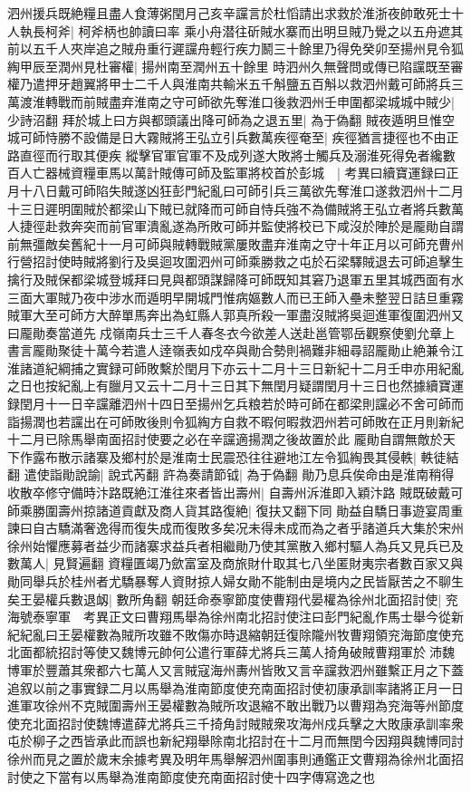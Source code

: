 泗州援兵既絶糧且盡人食薄粥閏月己亥辛讜言於杜慆請出求救於淮浙夜帥敢死士十人執長柯斧|{
	柯斧柄也帥讀曰率}
乘小舟潜往斫賊水寨而出明旦賊乃覺之以五舟遮其前以五千人夾岸追之賊舟重行遲讜舟輕行疾力鬭三十餘里乃得免癸卯至揚州見令狐綯甲辰至潤州見杜審權|{
	揚州南至潤州五十餘里}
時泗州久無聲問或傳已陷讜既至審權乃遣押牙趙翼將甲士二千人與淮南共輸米五千斛鹽五百斛以救泗州戴可師將兵三萬渡淮轉戰而前賊盡弃淮南之守可師欲先奪淮口後救泗州壬申圍都梁城城中賊少|{
	少詩沼翻}
拜於城上曰方與都頭議出降可師為之退五里|{
	為于偽翻}
賊夜遁明旦惟空城可師恃勝不設備是日大霧賊將王弘立引兵數萬疾徑奄至|{
	疾徑猶言捷徑也不由正路直徑而行取其便疾}
縱擊官軍官軍不及成列遂大敗將士觸兵及溺淮死得免者纔數百人亡器械資糧車馬以萬計賊傳可師及監軍將校首於彭城　|{
	考異曰續寶運録曰正月十八日戴可師陷失賊遂凶狂彭門紀亂曰可師引兵三萬欲先奪淮口遂救泗州十二月十三日遲明圍賊於都梁山下賊已就降而可師自恃兵強不為備賊將王弘立者將兵數萬人捷徑赴救奔突而前官軍潰亂遂為所敗可師并監使將校已下咸沒於陣於是龎勛自謂前無彊敵矣舊紀十一月可師與賊轉戰賊黨屢敗盡弃淮南之守十年正月以可師充曹州行營招討使時賊將劉行及吳迴攻圍泗州可師乘勝救之屯於石梁驛賊退去可師追擊生擒行及賊保都梁城登城拜曰見與都頭謀歸降可師既知其窘乃退軍五里其城西面有水三面大軍賊乃夜中涉水而遁明早開城門惟病嫗數人而已王師入壘未整翌日詰旦重霧賊軍大至可師方大醉單馬奔出為虹縣人郭真所殺一軍盡沒賊將吳迴進軍復圍泗州又曰龎勛奏當道先戍嶺南兵士三千人春冬衣今欲差人送赴邕管鄂岳觀察使劉允章上書言龎勛聚徒十萬今若遣人逹嶺表如戍卒與勛合勢則禍難非細尋詔龎勛止絶兼令江淮諸道紀綱捕之實録可師敗繫於閏月下亦云十二月十三日新紀十二月壬申亦用紀亂之日也按紀亂上有臘月又云十二月十三日其下無閏月疑謂閏月十三日也然據續寶運録閏月十一日辛讜離泗州十四日至揚州乞兵粮若於時可師在都梁則讜必不舍可師而詣揚潤也若讜出在可師敗後則令狐綯方自救不暇何暇救泗州若可師敗在正月則新紀十二月已除馬舉南面招討使要之必在辛讜適揚潤之後故置於此}
龎勛自謂無敵於天下作露布散示諸寨及鄉村於是淮南士民震恐往往避地江左令狐綯畏其侵軼|{
	軼徒結翻}
遣使詣勛說諭|{
	說式芮翻}
許為奏請節钺|{
	為于偽翻}
勛乃息兵俟命由是淮南稍得收散卒修守備時汴路既絶江淮往來者皆出壽州|{
	自壽州泝淮即入穎汴路}
賊既破戴可師乘勝圍壽州掠諸道貢獻及商人貨其路復絶|{
	復扶又翻下同}
勛益自驕日事遊宴周重諫曰自古驕滿奢逸得而復失成而復敗多矣况未得未成而為之者乎諸道兵大集於宋州徐州始懼應募者益少而諸寨求益兵者相繼勛乃使其黨散入鄉村驅人為兵又見兵已及數萬人|{
	見賢遍翻}
資糧匱竭乃歛富室及商旅財什取其七八坐匿財夷宗者數百家又與勛同舉兵於桂州者尤驕暴奪人資財掠人婦女勛不能制由是境内之民皆厭苦之不聊生矣王晏權兵數退衂|{
	數所角翻}
朝廷命泰寧節度使曹翔代晏權為徐州北面招討使|{
	兖海號泰寧軍　考異正文曰曹翔馬舉為徐州南北招討使注曰彭門紀亂作馬士舉今從新紀紀亂曰王晏權數為賊所攻雖不敗傷亦時退縮朝廷復除隴州牧曹翔領兖海節度使充北面都統招討等使又魏博元帥何公遣行軍薛尤將兵三萬人掎角破賊曹翔軍於沛魏博軍於豐蕭其衆都六七萬人又言賊寇海州夀州皆敗又言辛讜救泗州雖繫正月之下蓋追叙以前之事實録二月以馬舉為淮南節度使充南面招討使初康承訓率諸將正月一日進軍攻徐州不克賊圍壽州王晏權數為賊所攻退縮不敢出戰乃以曹翔為兖海等州節度使充北面招討使魏博遣薛尤將兵三千掎角討賊賊衆攻海州戍兵擊之大敗康承訓率衆屯於柳子之西皆承此而誤也新紀翔舉除南北招討在十二月而無閏今因翔與魏博同討徐州而見之置於歲末余據考異及明年馬舉解泗州圍事則通鑑正文曹翔為徐州北面招討使之下當有以馬舉為淮南節度使充南面招討使十四字傳寫逸之也}
